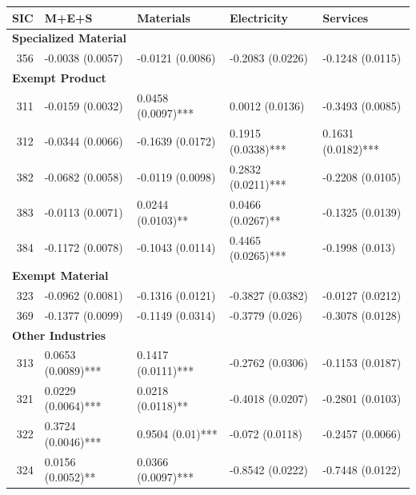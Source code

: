 \documentclass[
  12pt]{article}
\theoremstyle{definition}
\theoremstyle{remark}
\begin{document}
\begin{table}
{\centering
\begin{tabular}[t]{r|l|l|l|l}
\hline
SIC & M+E+S & Materials & Electricity & Services\\
\hline
\multicolumn{5}{l}{\textbf{Specialized Material}}\\
\hline
\hspace{1em}356 & -0.0038 (0.0057) & -0.0121 (0.0086) & -0.2083 (0.0226) & -0.1248 (0.0115)\\
\hline
\multicolumn{5}{l}{\textbf{Exempt Product}}\\
\hline
\hspace{1em}311 & -0.0159 (0.0032) & 0.0458 (0.0097)*** & 0.0012 (0.0136) & -0.3493 (0.0085)\\
\hline
\hspace{1em}312 & -0.0344 (0.0066) & -0.1639 (0.0172) & 0.1915 (0.0338)*** & 0.1631 (0.0182)***\\
\hline
\hspace{1em}382 & -0.0682 (0.0058) & -0.0119 (0.0098) & 0.2832 (0.0211)*** & -0.2208 (0.0105)\\
\hline
\hspace{1em}383 & -0.0113 (0.0071) & 0.0244 (0.0103)** & 0.0466 (0.0267)** & -0.1325 (0.0139)\\
\hline
\hspace{1em}384 & -0.1172 (0.0078) & -0.1043 (0.0114) & 0.4465 (0.0265)*** & -0.1998 (0.013)\\
\hline
\multicolumn{5}{l}{\textbf{Exempt Material}}\\
\hline
\hspace{1em}323 & -0.0962 (0.0081) & -0.1316 (0.0121) & -0.3827 (0.0382) & -0.0127 (0.0212)\\
\hline
\hspace{1em}369 & -0.1377 (0.0099) & -0.1149 (0.0314) & -0.3779 (0.026) & -0.3078 (0.0128)\\
\hline
\multicolumn{5}{l}{\textbf{Other Industries}}\\
\hline
\hspace{1em}313 & 0.0653 (0.0089)*** & 0.1417 (0.0111)*** & -0.2762 (0.0306) & -0.1153 (0.0187)\\
\hline
\hspace{1em}321 & 0.0229 (0.0064)*** & 0.0218 (0.0118)** & -0.4018 (0.0207) & -0.2801 (0.0103)\\
\hline
\hspace{1em}322 & 0.3724 (0.0046)*** & 0.9504 (0.01)*** & -0.072 (0.0118) & -0.2457 (0.0066)\\
\hline
\hspace{1em}324 & 0.0156 (0.0052)** & 0.0366 (0.0097)*** & -0.8542 (0.0222) & -0.7448 (0.0122)\\

\end{tabular}}
\end{table}
\end{document}
